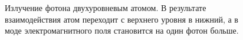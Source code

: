 \begin{figure}
\centering



\caption{Излучение фотона двухуровневым атомом. В результате
  взаимодействия атом переходит с верхнего уровня в нижний, а в моде
  электромагнитного поля становится на один фотон больше.}
\label{figPart1Ch2_4}
\end{figure}
